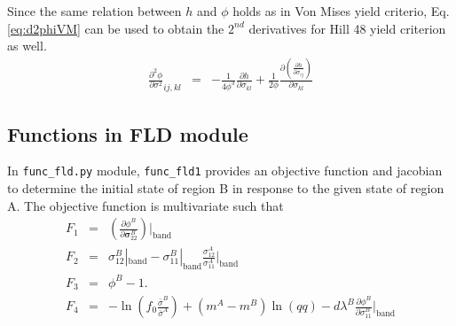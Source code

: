 \documentclass[12pt]{amsart}
\begin{document}
Since the same relation between $h$ and $\phi$ holds as in Von Mises yield criterio, Eq. \ref{eq:d2phiVM} can be used to obtain the $2^{nd}$ derivatives for Hill 48 yield criterion as well.
\begin{eqnarray}
  \label{eq:d2phiHill}
  \frac{\partial^2\phi}{\partial\sigma^2}_{ij,kl}&=& - \frac{1}{4\phi^3} \frac{\partial h}{\partial\sigma_{kl}}  + \frac{1}{2\phi}  \frac{\partial(  \frac{\partial h}{\partial \sigma_{ij}}   )}{\partial\sigma_{kl}}
\end{eqnarray}

\subsection{Functions in FLD module}
In \verb|func_fld.py| module, \verb|func_fld1| provides an objective function and jacobian to determine the initial state of region B in response to the given state of region A.
The objective function is multivariate such that
\begin{eqnarray}
  \label{eq:objf_func_fld1}
  F_1&=& (\frac{\partial \phi^B}{\partial \boldsymbol{\sigma}^B_{22}})|_\text{band}\\
  F_2&=& \sigma_{12}^B|_\text{band}- \sigma_{11}^B|_\text{band} \frac{\sigma_{12}^A}{\sigma_{11}^A}|_\text{band}\nonumber\\
  F_3&=& \phi^B- 1. \nonumber\\
  F_4&=& -\ln(f_0 \frac{\bar{\sigma}^B}{\bar{\sigma}^A}) + (m^A-m^B) \ln(qq) - d\lambda^B \frac{\partial \phi^B}{\partial \sigma^B_{11}}|_\text{band}\nonumber
\end{eqnarray}
\end{document}
